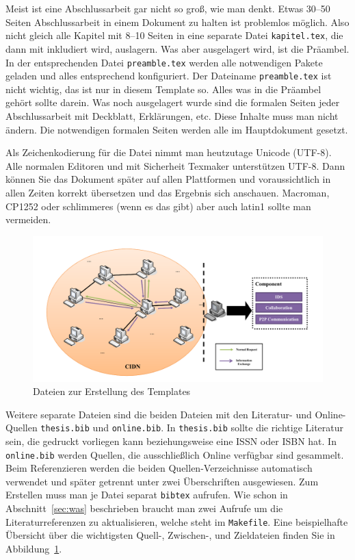 \documentclass[11pt,a4paper]{report}
\begin{document}
Meist ist eine Abschlussarbeit gar nicht so groß, wie man denkt.
Etwas 30--50 Seiten Abschlussarbeit in einem Dokument zu halten ist
problemlos möglich. 
Also nicht gleich alle Kapitel mit 8--10 Seiten in eine separate 
Datei \verb|kapitel.tex|, die dann mit \verb||
inkludiert wird, auslagern.
Was aber ausgelagert wird, ist die Präambel. 
In der entsprechenden Datei \verb|preamble.tex| werden alle 
notwendigen Pakete geladen und alles entsprechend konfiguriert.
Der Dateiname \verb|preamble.tex| ist nicht wichtig, das ist 
nur in diesem Template so.
Alles was in die Präambel gehört sollte darein.
Was noch ausgelagert wurde sind die formalen Seiten jeder 
Abschlussarbeit mit Deckblatt, Erklärungen, etc. 
Diese Inhalte muss man nicht ändern. 
Die notwendigen formalen Seiten werden alle im Hauptdokument gesetzt. 

Als Zeichenkodierung für die Datei nimmt man heutzutage Unicode (UTF-8).
Alle normalen Editoren und mit Sicherheit Texmaker unterstützen UTF-8.
Dann können Sie das Dokument später auf allen Plattformen und voraussichtlich
in allen Zeiten korrekt übersetzen und das Ergebnis sich anschauen.
Macroman, CP1252 oder schlimmeres (wenn es das gibt) aber auch latin1 
sollte man vermeiden.

\begin{figure}[htp]
\centering
\includegraphics[width=.9\textwidth]{images/cids}
\caption{Dateien zur Erstellung des Templates}
\label{fig:templateprozess}
\end{figure}

Weitere separate Dateien sind die beiden Dateien mit 
den Literatur- und Online-Quellen 
\verb|thesis.bib| und \verb|online.bib|. \label{page:bib}
In \verb|thesis.bib| sollte die richtige Literatur sein, 
die gedruckt vorliegen kann beziehungsweise eine ISSN oder ISBN hat. 
In \verb|online.bib| werden Quellen, die ausschließlich Online verfügbar
sind gesammelt.  
Beim Referenzieren werden die beiden Quellen-Verzeichnisse automatisch
verwendet und später getrennt unter zwei Überschriften ausgewiesen. 
Zum Erstellen muss man je Datei separat \lstinline{bibtex} aufrufen. 
Wie schon in Abschnitt~\ref{sec:was} beschrieben braucht man zwei
Aufrufe um die Literaturreferenzen zu aktualisieren, welche steht
im \verb|Makefile|.
Eine beispielhafte Übersicht über die wichtigsten Quell-, 
Zwischen-, und Zieldateien finden Sie in 
Abbildung~\ref{fig:templateprozess}.
\end{document}
